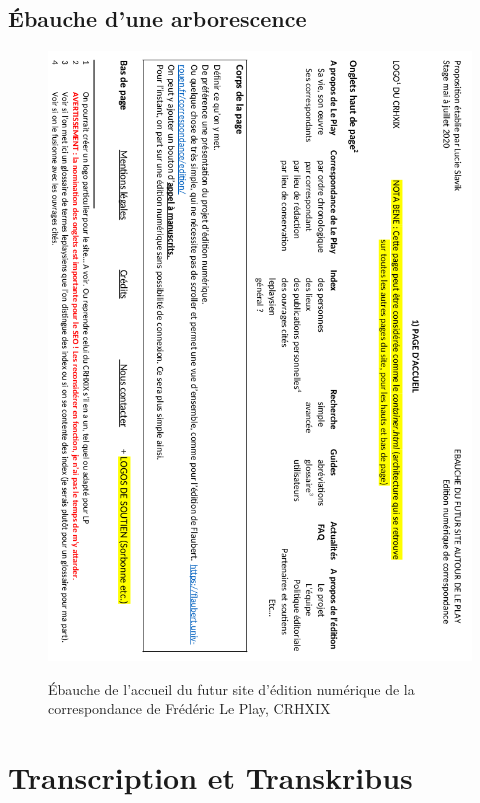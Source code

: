 \section{Ébauche d'une arborescence}

\begin{figure}[H]
    \centering
    \caption{Ébauche de l'accueil du futur site d'édition numérique de la correspondance de Frédéric Le Play, CRHXIX}
    \includegraphics[width=16cm]{images/accueil_site_LP.png}
    \label{accueil_site_LP}
\end{figure}

\chapter{Transcription et Transkribus}

